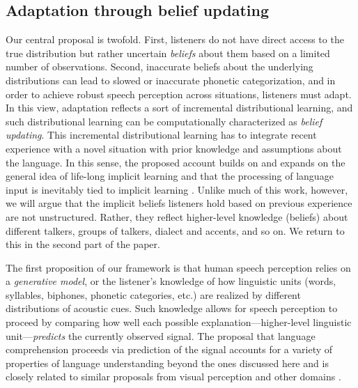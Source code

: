 \subsection{Adaptation through belief updating}
\label{sec:robust-speech-perc}



Our central proposal is twofold.  First, listeners do not have direct access to the true distribution but rather uncertain \emph{beliefs} about them based on a limited number of observations.  Second, inaccurate beliefs about the underlying distributions can lead to slowed or inaccurate phonetic categorization, and in order to achieve robust speech perception across situations, listeners must adapt.  In this view, adaptation reflects a sort of incremental distributional learning,
and such distributional learning can be computationally characterized as \emph{belief updating}. This incremental distributional learning has to integrate recent experience with a novel situation with prior knowledge and assumptions about the language. In this sense, the proposed account builds on and expands on the general idea of life-long implicit learning \cite{Botvinick2004,Chang2006,Elman1990} and that the processing of language input is inevitably tied to implicit learning \autocite[e.g.,][]{Clark2013,Dell2014,Jaeger2013a}. Unlike much of this work, however, we will argue that the implicit beliefs listeners hold based on previous experience are not unstructured. Rather, they reflect higher-level knowledge (beliefs) about different talkers, groups of talkers, dialect and accents, and so on.  We return to this in the second part of the paper.

The first proposition of our framework is that human speech perception relies on a \emph{generative model}, or the listener's knowledge of how linguistic units (words, syllables, biphones, phonetic categories, etc.) are realized by different distributions of acoustic cues.  Such knowledge allows for speech perception to proceed by comparing how well each possible explanation---higher-level linguistic unit---\emph{predicts} the currently observed signal.  The proposal that language comprehension proceeds via prediction of the signal accounts for a variety of properties of language understanding beyond the ones discussed here \autocite[cf.][]{Dell2014,Farmer2013,Jaeger2013a,MacDonald2013,Pickering2013} and is closely related to similar proposals from visual perception and other domains \cite{Clark2013,Friston2005,Hinton2007,Huang2011,Rao1999}.

